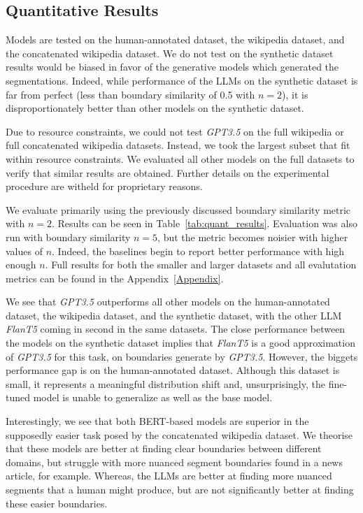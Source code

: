 
\subsection{Quantitative Results}

Models are tested on the human-annotated dataset, the wikipedia dataset, and the concatenated wikipedia dataset. We do not test on the synthetic dataset results would be biased in favor of the generative models which generated the segmentations. Indeed, while performance of the LLMs on the synthetic dataset is far from perfect (less than boundary similarity of 0.5 with $n=2$), it is disproportionately better than other models on the synthetic dataset.

Due to resource constraints, we could not test \emph{GPT3.5} on the full wikipedia or full concatenated wikipedia datasets. Instead, we took the largest subset that fit within resource constraints. We evaluated all other models on the full datasets to verify that similar results are obtained. Further details on the experimental procedure are witheld for proprietary reasons.

We evaluate primarily using the previously discussed boundary similarity metric with $n=2$. Results can be seen in Table~\ref{tab:quant_results}. Evaluation was also run with boundary similarity $n=5$, but the metric becomes noisier with higher values of $n$. Indeed, the baselines begin to report better performance with high enough $n$. Full results for both the smaller and larger datasets and all evalutation metrics can be found in the Appendix~\ref{Appendix}.

We see that \emph{GPT3.5} outperforms all other models on the human-annotated dataset, the wikipedia dataset, and the synthetic dataset, with the other LLM \emph{FlanT5} coming in second in the same datasets. The close performance between the models on the synthetic dataset implies that \emph{FlanT5} is a good approximation of \emph{GPT3.5} for this task, on boundaries generate by \emph{GPT3.5}. However, the biggets performance gap is on the human-annotated dataset. Although this dataset is small, it represents a meaningful distribution shift and, unsurprisingly, the fine-tuned model is unable to generalize as well as the base model.

Interestingly, we see that both BERT-based models are superior in the supposedly easier task posed by the concatenated wikipedia dataset. We theorise that these models are better at finding clear boundaries between different domains, but struggle with more nuanced segment boundaries found in a news article, for example. Whereas, the LLMs are better at finding more nuanced segments that a human might produce, but are not significantly better at finding these easier boundaries.

